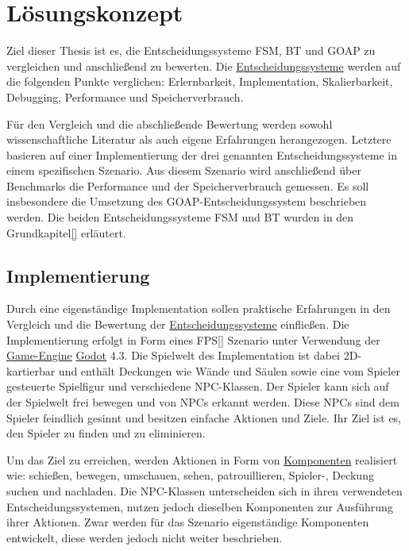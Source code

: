 \chapter{L\"{o}sungskonzept}
\label{chap:l\"{o}sungskonzept}

Ziel dieser Thesis ist es, die Entscheidungssysteme FSM, BT und GOAP zu vergleichen und anschlie\ss{}end zu bewerten. Die \hyperref[chap:entscheidungssysteme]{Entscheidungssysteme} werden auf die folgenden Punkte verglichen: Erlernbarkeit, Implementation, Skalierbarkeit, Debugging, Performance und Speicherverbrauch.

F\"{u}r den Vergleich und die abschlie\ss{}ende Bewertung werden sowohl wissenschaftliche Literatur als auch eigene Erfahrungen herangezogen. Letztere basieren auf einer Implementierung der drei genannten Entscheidungssysteme in einem spezifischen Szenario. Aus diesem Szenario wird anschlie\ss{}end \"{u}ber Benchmarks die Performance und der Speicherverbrauch gemessen. Es soll insbesondere die Umsetzung des GOAP-Entscheidungssystem beschrieben werden. Die beiden Entscheidungssysteme FSM und BT wurden in den Grundkapitel\ref{} erl\"{a}utert.

\section{Implementierung}
\label{chap:lk implementierung}

Durch eine eigenst\"{a}ndige Implementation sollen praktische Erfahrungen in den Vergleich und die Bewertung der \hyperref[chap:entscheidungssysteme]{Entscheidungssysteme} einflie\ss{}en. Die Implementierung erfolgt in Form eines FPS\ref{} Szenario unter Verwendung der \hyperref[chap:game engines]{Game-Engine} \hyperref[chap:godot]{Godot} 4.3. Die Spielwelt des Implementation ist dabei 2D-kartierbar und enth\"{a}lt Deckungen wie W\"{a}nde und S\"{a}ulen sowie eine vom Spieler gesteuerte Spielfigur und verschiedene NPC-Klassen. Der Spieler kann sich auf der Spielwelt frei bewegen und von NPCs erkannt werden. Diese NPCs sind dem Spieler feindlich gesinnt und besitzen einfache Aktionen und Ziele. Ihr Ziel ist es, den Spieler zu finden und zu eliminieren.

Um das Ziel zu erreichen, werden Aktionen in Form von \hyperref[chap:game-objects]{Komponenten} realisiert wie: schie\ss{}en, bewegen, umschauen, sehen, patrouillieren, Spieler-, Deckung suchen und nachladen. Die NPC-Klassen unterscheiden sich in ihren verwendeten Entscheidungssystemen, nutzen jedoch dieselben Komponenten zur Ausf\"{u}hrung ihrer Aktionen. Zwar werden f\"{u}r das Szenario eigenst\"{a}ndige Komponenten entwickelt, diese werden jedoch nicht weiter beschrieben.

